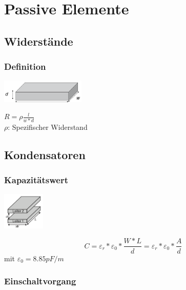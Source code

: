 \section{Passive Elemente}

\subsection{Widerstände}

\subsubsection{Definition}
\begin{multicols}{2}
\includegraphics[width=0.3\textwidth]{pictures/widerstand.png}

\columnbreak

$R=\rho\frac{l}{w*d}$ \\
$\rho$: Spezifischer Widerstand
\end{multicols} 

\subsection{Kondensatoren}
\subsubsection{Kapazitätswert}
\begin{multicols}{2}
	\begin{center}
		\includegraphics[width=0.15\textwidth]{pictures/kapazitaetswert}
	\end{center}
	\columnbreak

	\begin{equation*}
		C=\varepsilon_{r}*\varepsilon_{0}*\frac{W*L}{d}=\varepsilon_{r}*\varepsilon_{0}*\frac{A}{d}
	\end{equation*}
	mit $\varepsilon_{0}= 8.85 pF/m$
\end{multicols}


\subsubsection{Einschaltvorgang}


